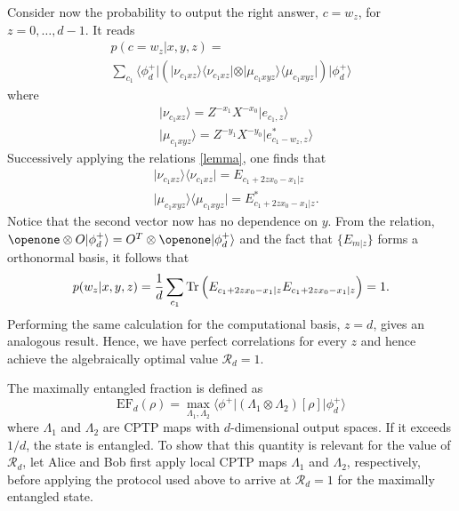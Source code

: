 \documentclass[aps,superscriptaddress,twocolumn,twoside,floatfix,pra,nofootinbib,a4paper]{revtex4-2}
\newcommand{\bracket}[3]{\langle#1\vert#2\vert#3\rangle}
\begin{document}
	Consider now the probability to output the right answer, $c=w_z$, for $z=0,\ldots,d-1$. It reads
	\begin{multline}
	p(c=w_z|x,y,z)=\\
	\sum_{c_1}\bracket{\phi^+_d}{\left(\vert \nu_{c_1xz}\rangle\langle \nu_{c_1xz}\vert \otimes \vert \mu_{c_1xyz}\rangle\langle \mu_{c_1xyz}\vert \right)}{\phi^+_d}
	\end{multline}
	where 
	\begin{align}
	& \vert{\nu_{c_1xz}\rangle}=Z^{-x_1}X^{-x_0} \vert{e_{c_1,z}\rangle} \\
    &\vert{\mu_{c_1xyz}\rangle}=Z^{-y_1}X^{-y_0} \vert{e^*_{c_1-w_z,z}\rangle}
    \end{align}
	Successively applying the relations \eqref{lemma}, one finds that
	\begin{align}\nonumber\label{q4}
	& 
 \vert \nu_{c_1xz}\rangle \langle \nu_{c_1xz}\vert =E_{c_1+2zx_0-x_1|z}\\
	& 
 \vert \mu_{c_1xyz}\rangle \langle \mu_{c_1xyz}\vert=E^*_{c_1+2zx_0-x_1|z}.
	\end{align}
	Notice that the second vector now has no dependence on $y$. From the relation, $\openone \otimes O \vert{\phi^+_d\rangle}=O^T \otimes \openone \vert{\phi^+_d\rangle}$ and the fact that $\{E_{m|z}\}$ forms a orthonormal basis, it follows that
	\begin{multline}
	p(w_z|x,y,z)=\frac{1}{d}\sum_{c_1}\Tr\left(E_{c_1+2zx_0-x_1|z}E_{c_1+2zx_0-x_1|z}\right)=1.
	\end{multline}
	Performing the same calculation for the computational basis, $z=d$, gives an analogous result. Hence, we have perfect correlations for every $z$ and hence achieve the algebraically optimal value $\mathcal{R}_d=1$.		




The maximally entangled fraction is defined as
\begin{equation}
\text{EF}_d(\rho)=\max_{\Lambda_1,\Lambda_2} \bracket{\phi^+}{(\Lambda_1 \otimes \Lambda_2) [\rho]}{\phi^+_d}
\end{equation}
where $\Lambda_1$ and $\Lambda_2$ are CPTP maps with $d$-dimensional output spaces. If it exceeds $1/d$, the state is entangled. To show that this quantity is relevant for the value of $\mathcal{R}_d$, let Alice and Bob first apply local CPTP maps  $\Lambda_1$ and $\Lambda_2$, respectively, before applying the protocol used above to arrive at $\mathcal{R}_d=1$ for the maximally entangled state. 
\end{document}
